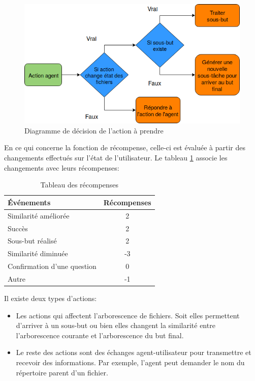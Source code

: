 \begin{figure}[H] 
	\centering
	\includegraphics[width=0.88\linewidth]{images/Conception/DM/action_diag.png}
	\caption{Diagramme de décision de l'action à prendre}\label{action_diag}
	
\end{figure}
En ce qui concerne la fonction de récompense, celle-ci est évaluée à partir des changements effectués sur l'état de l'utilisateur. Le tableau \ref{table_reward} associe les changements avec leurs récompenses:
\begin{table}[H]
	\begin{center}
		
		\begin{tabular}{|l|c|} %
			\hline
			\textbf{Événements} & \textbf{Récompenses}\\
			\hline
			Similarité améliorée & 2\\
			\hline
			Succès & 2\\
			\hline
			Sous-but réalisé & 2\\
			\hline
			Similarité diminuée & -3\\
			\hline
			Confirmation d'une question & 0\\
			\hline
			Autre & -1\\
			\hline
		\end{tabular}
		\caption{Tableau des récompenses}\label{table_reward}
	\end{center}
\end{table}
\par Il existe deux types d'actions:
\begin{itemize}
	\item Les actions qui affectent l'arborescence de fichiers. Soit elles permettent d'arriver à un sous-but ou bien elles changent la similarité entre l'arborescence courante et l'arborescence du but final.
	\item Le reste des actions sont des échanges agent-utilisateur pour transmettre et recevoir des informations. Par exemple, l'agent peut demander le nom du répertoire parent d'un fichier.
\end{itemize}
